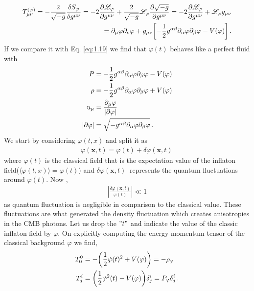 \begin{align}
    T_{\mu \nu }^{(\varphi )} = - \frac{2}{\sqrt{-g}} \fdv{S_{\varphi }}{g^{\mu \nu }} =- 2 \frac{\partial\mathscr{L}_\varphi }{\partial g^{\mu \nu }} + \frac{2}{\sqrt{-g}} \mathscr{L}_\varphi \pdv{\sqrt{-g}}{g^{\mu \nu }} = - 2 \pdv{\mathscr{L}_\varphi }{g^{\mu \nu }} + \mathscr{L}_\varphi g_{\mu \nu }\\ = \partial_{\mu } \varphi \partial_{\nu } \varphi + g_{\mu \nu } \qty[- \frac{1}{2} g^{\alpha \beta } \partial_{\alpha } \varphi \partial_{\beta} \varphi - V(\varphi )] \,. \label{2.18}
\end{align}
If we compare it with Eq. \ref{eq:1.19} we find that $\varphi(t)$ behaves like a perfect fluid with
\begin{align}
    P &= -\frac{1}{2} g^{\alpha \beta }\partial_{\alpha } \varphi \partial_{\beta} \varphi - V(\varphi ) \label{2.19} \\
    \rho &= - \frac{1}{2} g^{\alpha \beta }\partial_{\alpha } \varphi \partial_{\beta} \varphi  + V(\varphi )  \label{2.20} \\
    u_\mu &= \frac{\partial_{\mu}\varphi}{\abs{\partial \varphi }}  \\
    \abs{\partial \varphi} &= \sqrt{- g^{\alpha \beta }\partial_{\alpha } \varphi \partial_{\beta} \varphi}
    \,.
\end{align}
\hspace{0.5cm}We start by considering $\varphi(t,x)$ and split it as
\begin{align}
    \varphi (\mathbf{x}, t) = \varphi(t) + \delta \varphi (\mathbf{x}, t) \, \label{2.23}
\end{align}
where $\varphi(t)$ is the classical field that is the expectation value of the inflaton field(\(\langle \varphi(t,x) \rangle = \varphi(t)\)) and $\delta \varphi(\mathbf{x}, t)\ $ represents the quantum fluctuations around $\varphi(t)$.
Now , 
\begin{align}
    \left|\frac{\delta \varphi(\mathbf{x}, t)}{\varphi(t)} \right| \ll 1 \label{2.24}
\end{align}
as quantum fluctuation is negligible in comparison to the classical value. These fluctuations are what generated the density fluctuation which creates anisotropies in the CMB photons. Let us drop the $"t"$ and indicate the value of the classic inflaton field by $\varphi$. On explicitly computing the energy-momentum tensor of the classical background $\varphi$ we find,
\begin{align}
    T^{0}_{0} &= - \qty( \frac{1}{2} \dot{\varphi}(t)^2 + V(\varphi )) = - \rho_\varphi\label{2.25}\\
    T^{i}_{j} &= \qty( \frac{1}{2} \dot{\varphi}^2 (t) - V(\varphi)) \delta^{i}_{j} = P_\varphi \delta^{i}_{j}\,. \label{2.26}
\end{align}
